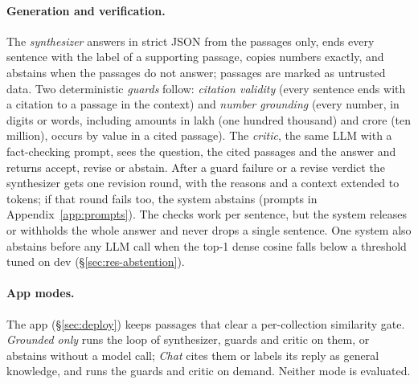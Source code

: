 \paragraph{Generation and verification.}
The \emph{synthesizer} answers in strict JSON from the passages only, ends every sentence with the label of a supporting passage, copies numbers exactly, and abstains when the passages do not answer; passages are marked as untrusted data.
Two deterministic \emph{guards} follow: \emph{citation validity} (every sentence ends with a citation to a passage in the context) and \emph{number grounding} (every number, in digits or words, including amounts in lakh (one hundred thousand) and crore (ten million), occurs by value in a cited passage).
The \emph{critic}, the same LLM with a fact-checking prompt, sees the question, the cited passages and the answer and returns accept, revise or abstain.
After a guard failure or a revise verdict the synthesizer gets one revision round, with the reasons and a context extended to  tokens; if that round fails too, the system abstains (prompts in Appendix~\ref{app:prompts}). The checks work per sentence, but the system releases or withholds the whole answer and never drops a single sentence.
One system also abstains before any LLM call when the top-1 dense cosine falls below a threshold tuned on dev (\S\ref{sec:res-abstention}).

\paragraph{App modes.}
The app (\S\ref{sec:deploy}) keeps passages that clear a per-collection similarity gate. \emph{Grounded only} runs the loop of synthesizer, guards and critic on them, or abstains without a model call; \emph{Chat} cites them or labels its reply as general knowledge, and runs the guards and critic on demand. Neither mode is evaluated.
